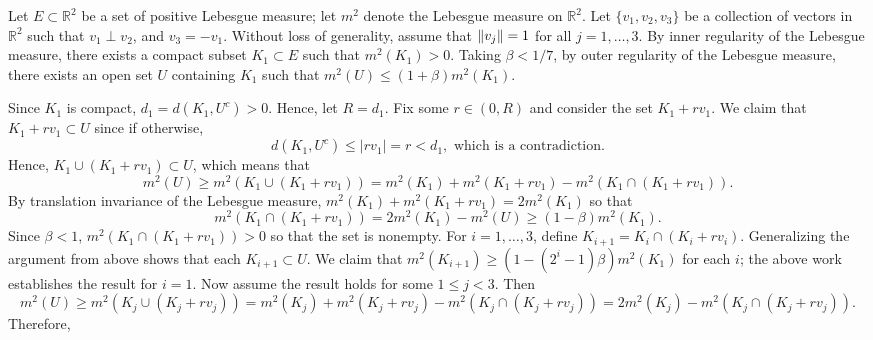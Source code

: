 \documentclass{article}
\begin{document}
\begin{solutions}
	Let $E \subset \mathbb{R}^{2}$ be a set of positive Lebesgue measure; let $m^{2}$ denote the Lebesgue measure on $\mathbb{R}^{2}$. Let $\{v_{1}, v_{2}, v_{3}\}$ be a collection of vectors in $\mathbb{R}^{2}$ such that $v_{1} \perp v_{2}$, and $v_{3} = -v_{1}$. Without loss of generality, assume that $\left\Vert v_{j} \right\Vert = 1$ for all $j = 1, \ldots, 3$. By inner regularity of the Lebesgue measure, there exists a compact subset $K_{1} \subset E$ such that $m^{2}(K_{1}) > 0$. Taking $\beta < 1/7$, by outer regularity of the Lebesgue measure, there exists an open set $U$ containing $K_{1}$ such that $m^{2}(U) \leq (1 + \beta)m^{2}(K_{1})$.
	
	Since $K_{1}$ is compact, $d_{1} = d(K_{1}, U^{c}) > 0$. Hence, let $R = d_{1}$. Fix some $r \in (0, R)$ and consider the set $K_{1} + rv_{1}$. We claim that $K_{1} + rv_{1} \subset U$ since if otherwise, 
		\begin{equation}
			d(K_{1}, U^{c}) \leq |rv_{1}| = r < d_{1}, \text{ which is a contradiction.}
		\end{equation}
	Hence, $K_{1} \cup (K_{1} + rv_{1}) \subset U$, which means that 
		\begin{equation}
			m^{2}(U) \geq m^{2}(K_{1} \cup (K_{1} + rv_{1})) = m^{2}(K_{1}) + m^{2}(K_{1} + rv_{1}) - m^{2}(K_{1} \cap (K_{1} + rv_{1})). 
		\end{equation}
	By translation invariance of the Lebesgue measure, $m^{2}(K_{1}) + m^{2}(K_{1} + rv_{1}) = 2m^{2}(K_{1})$ so that 
		\begin{equation}
			m^{2}(K_{1} \cap (K_{1} + rv_{1})) = 2m^{2}(K_{1}) - m^{2}(U) \geq (1 - \beta)m^{2}(K_{1}). 
		\end{equation}
	Since $\beta < 1$, $m^{2}(K_{1} \cap (K_{1} + rv_{1})) > 0$ so that the set is nonempty. For $i = 1, \ldots, 3$, define $K_{i + 1} = K_{i} \cap  (K_{i} + rv_{i})$. Generalizing the argument from above shows that each $K_{i + 1} \subset U$. We claim that $m^{2}(K_{i + 1}) \geq (1 - (2^{i} - 1)\beta)m^{2}(K_{1})$ for each $i$; the above work establishes the result for $i = 1$. Now assume the result holds for some $1 \leq j < 3$. Then 
		\begin{equation}
			m^{2}(U) \geq m^{2}(K_{j} \cup (K_{j} + rv_{j})) = m^{2}(K_{j}) + m^{2}(K_{j} + rv_{j}) - m^{2}(K_{j} \cap (K_{j} + rv_{j})) = 2m^{2}(K_{j}) - m^{2}(K_{j} \cap (K_{j} + rv_{j})). 
		\end{equation} 
	Therefore, 
		\begin{align}
			\begin{split} 

\end{split}
\end{align}
\end{solutions}
\end{document}

